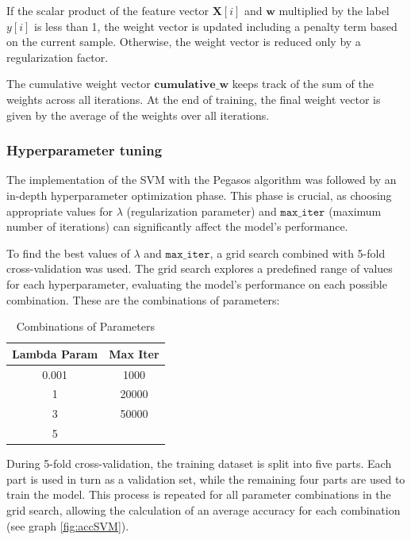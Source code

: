 \documentclass[a4paper, 10pt]{article}
\begin{document}
If the scalar product of the feature vector \(\mathbf{X}[i]\) and \(\mathbf{w}\) multiplied by the label \(y[i]\) is less than 1, the weight vector is updated including a penalty term based on the current sample. Otherwise, the weight vector is reduced only by a regularization factor.

The cumulative weight vector \(\mathbf{cumulative\_w}\) keeps track of the sum of the weights across all iterations. At the end of training, the final weight vector is given by the average of the weights over all iterations.

\subsubsection{Hyperparameter tuning}

The implementation of the SVM with the Pegasos algorithm was followed by an in-depth hyperparameter optimization phase. This phase is crucial, as choosing appropriate values for \(\lambda\) (regularization parameter) and \(\texttt{max\_iter}\) (maximum number of iterations) can significantly affect the model's performance.

To find the best values of \(\lambda\) and \(\texttt{max\_iter}\), a grid search combined with 5-fold cross-validation was used. The grid search explores a predefined range of values for each hyperparameter, evaluating the model's performance on each possible combination. These are the combinations of parameters:
\begin{table}[h]
\centering
\begin{tabular}{|c|c|}
\hline
\textbf{Lambda Param} & \textbf{Max Iter} \\ \hline
0.001 & 1000 \\ \hline
1 & 20000 \\ \hline
3 & 50000 \\ \hline
5 &  \\ \hline
\end{tabular}
\caption{Combinations of Parameters}
\label{tab:param_combinations}
\end{table}

During 5-fold cross-validation, the training dataset is split into five parts. Each part is used in turn as a validation set, while the remaining four parts are used to train the model. This process is repeated for all parameter combinations in the grid search, allowing the calculation of an average accuracy for each combination (see graph \ref{fig:accSVM}).
\end{document}
